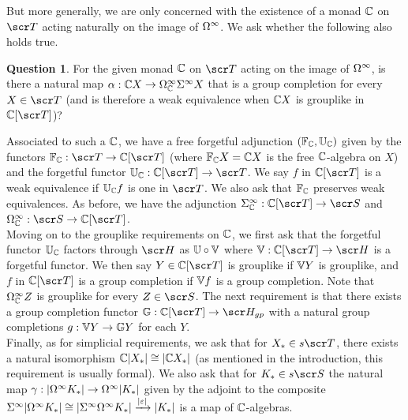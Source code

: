 \documentclass{amsart}
\theoremstyle{definition}
\newtheorem{quest}[defn]{Question}
\begin{document}
But more generally, we are only concerned with the existence of a monad $\mathbb{C}$ on $\sT$ acting naturally on the image of $\Omega^{\infty}$. We ask whether the following also holds true. 

\begin{quest}\label{thm:approxthm}
For the given monad $\mathbb{C}$ on $\sT$ acting on the image of $\Omega^{\infty}$, is there a natural map $\alpha : \mathbb{C} X \to \Omega^{\infty}_{\mathbb{C}}\Sigma^{\infty}X$  that is a group completion for every $X \in \sT$ (and is therefore a weak equivalence when $\mathbb{C} X$ is grouplike in $\bC[\sT]$)?
\end{quest}

Associated to such a $\mathbb{C}$, we have a free forgetful adjunction $(\mathbb{F}_{\mathbb{C}},\mathbb{U}_{\mathbb{C}})$ given by the functors $\bF_{\bC} : \sT \to \bC[\sT]$ (where $\mathbb{F}_{\mathbb{C}}X = \mathbb{C} X$ is the free $\mathbb{C}$-algebra on $X$) and the forgetful functor $\bU_{\bC} : \bC[\sT] \to \sT$. We say $f$ in $\bC[\sT]$ is a weak equivalence if $\mathbb{U}_{\mathbb{C}}f$ is one in $\sT$. We also ask that $\mathbb{F}_{\mathbb{C}}$ preserves weak equivalences. As before, we have the adjunction $\SI_{\bC}^{\infty}:\bC[\sT] \to \sS$ and $\OM_{\bC}^{\infty} : \sS \to \bC[\sT]$.\\

Moving on to the grouplike requirements on $\mathbb{C}$, we first ask that the forgetful functor $\mathbb{U}_{\mathbb{C}}$ factors through $\sH$ as $\mathbb{U} \circ \mathbb{V}$ where $\bV : \bC [\sT] \to \sH$ is a forgetful functor. We then say $Y \in \bC[\sT]$ is grouplike if $\mathbb{V} Y$ is grouplike, and $f$ in $\bC[\sT]$ is a group completion if $\mathbb{V} f$ is a group completion. Note that $\Omega^{\infty}_{\mathbb{C}}Z$ is grouplike for every $Z \in \sS$. The next requirement is that there exists a group completion functor $\bG : \bC [\sT] \to \sH_{gp}$ with a natural group completions $g : \mathbb{V} Y \to \mathbb{G} Y$ for each $Y$.\\

Finally, as for simplicial requirements, we ask that for $X_{*} \in s\sT$, there exists a natural isomorphism $\mathbb{C}|X_{*}| \cong |\mathbb{C} X_{*}|$ (as mentioned in the introduction, this requirement is usually formal). We also ask that for $K_{*} \in s\sS$ the natural map $\gamma : |\Omega^{\infty}K_{*}| \to \Omega^{\infty}|K_{*}|$ given by the adjoint to the composite $\Sigma^{\infty}|\Omega^{\infty}K_{*}| \cong |\Sigma^{\infty}\Omega^{\infty}K_{*}| \xrightarrow{|\varepsilon|}|K_{*}|$ is a map of $\mathbb{C}$-algebras.\\
\end{document}
